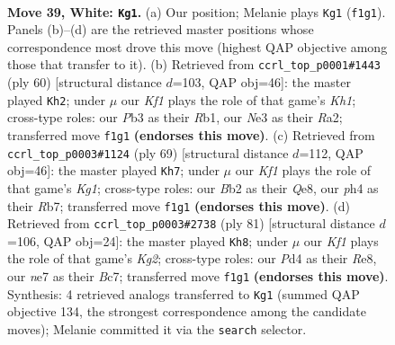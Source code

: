 \documentclass[11pt]{article}
\begin{document}
\clearpage

\begin{figure}[p]\centering
\begin{subfigure}{0.46\textwidth}\centering
\resizebox{\linewidth}{!}{%
\newchessgame
\chessboard[
  setfen={1n1qkb1r/4n3/r1p3p1/3p2P1/3P1P1p/1P2NB1P/1B1Q3R/2R2K2 w - - 7 39},
  showmover=false,
  pgfstyle=straightmove, color=movearrow, markmove={f1-g1}
]}
\caption{}
\end{subfigure}\hfill
\begin{subfigure}{0.46\textwidth}\centering
\resizebox{\linewidth}{!}{%
\newchessgame
\chessboard[
  setfen={r5k1/2rb1p2/1n1q2p1/1P1p3p/p2N3P/4P1P1/R2QBP2/1R5K w - - 10 31},
  showmover=false,
  pgfstyle=straightmove, color=movearrow, markmove={h1-h2}
]}
\caption{}
\end{subfigure}
\\[4pt]
\begin{subfigure}{0.46\textwidth}\centering
\resizebox{\linewidth}{!}{%
\newchessgame
\chessboard[
  setfen={r3q1k1/1rn3b1/3p2p1/1pnPp1Pp/1N2P3/P1N2R1P/2Q3K1/1RB5 b - - 12 35},
  showmover=false,
  pgfstyle=straightmove, color=movearrow, markmove={g8-h7}
]}
\caption{}
\end{subfigure}\hfill
\begin{subfigure}{0.46\textwidth}\centering
\resizebox{\linewidth}{!}{%
\newchessgame
\chessboard[
  setfen={4r3/2b3k1/2p1rpq1/2Bp3p/P2P2pn/3N4/1R3PPP/R4QK1 b - - 5 41},
  showmover=false,
  pgfstyle=straightmove, color=movearrow, markmove={g7-h8}
]}
\caption{}
\end{subfigure}
\caption{\textbf{Move 39, White: \texttt{Kg1}.} (a) Our position; Melanie plays \texttt{Kg1} (\texttt{f1g1}). Panels (b)--(d) are the retrieved master positions whose correspondence most drove this move (highest QAP objective among those that transfer to it). (b) Retrieved from \texttt{ccrl\_top\_p0001\#1443} (ply 60) [structural distance $d$=103, QAP obj=46]: the master played \texttt{Kh2}; under $\mu$ our \emph{Kf1} plays the role of that game's \emph{Kh1}; cross-type roles: our \emph{P}b3 as their \emph{R}b1, our \emph{N}e3 as their \emph{R}a2; transferred move \texttt{f1g1} \textbf{(endorses this move)}. (c) Retrieved from \texttt{ccrl\_top\_p0003\#1124} (ply 69) [structural distance $d$=112, QAP obj=46]: the master played \texttt{Kh7}; under $\mu$ our \emph{Kf1} plays the role of that game's \emph{Kg1}; cross-type roles: our \emph{B}b2 as their \emph{Q}e8, our \emph{p}h4 as their \emph{R}b7; transferred move \texttt{f1g1} \textbf{(endorses this move)}. (d) Retrieved from \texttt{ccrl\_top\_p0003\#2738} (ply 81) [structural distance $d$=106, QAP obj=24]: the master played \texttt{Kh8}; under $\mu$ our \emph{Kf1} plays the role of that game's \emph{Kg2}; cross-type roles: our \emph{P}d4 as their \emph{R}e8, our \emph{n}e7 as their \emph{B}c7; transferred move \texttt{f1g1} \textbf{(endorses this move)}. Synthesis: 4 retrieved analogs transferred to \texttt{Kg1} (summed QAP objective 134, the strongest correspondence among the candidate moves); Melanie committed it via the \texttt{search} selector.}
\label{fig:thought-m76}
\end{figure}
\end{document}
